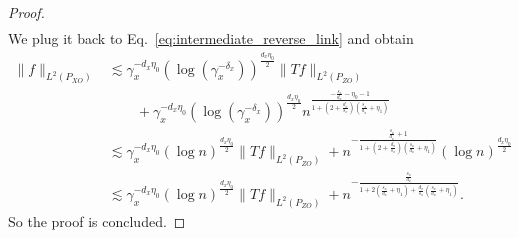 \documentclass[11pt]{article}
\newcommand{\0}{\mathbf{0}}
\begin{document}
\begin{appendix}
\begin{proof}
\begin{align*}
\end{align*}
We plug it back to Eq.~\eqref{eq:intermediate_reverse_link} and obtain
\begin{align*}
    \|f\|_{L^2(P_{XO})} &\lesssim \gamma_x^{-d_x\eta_0} (\log (\gamma_x^{-\delta_x}))^{\frac{d_x\eta_0}{2}} \|Tf\|_{L^2(P_{ZO})} \\
    &\qquad + \gamma_x^{-d_x\eta_0} (\log (\gamma_x^{-\delta_x}))^{\frac{d_x\eta_0}{2}} n^{\frac{-\frac{s_x}{d_x} - \eta_0 - 1}{1+(2+\frac{d_o}{s_o})(\frac{s_x}{d_x}+\eta_1)}} \\
    &\lesssim \gamma_x^{-d_x\eta_0} (\log n)^{\frac{d_x\eta_0}{2}} \|Tf\|_{L^2(P_{ZO})} + n^{-\frac{\frac{s_x}{d_x} + 1}{1+(2 + \frac{d_o}{s_o})(\frac{s_x}{d_x}+\eta_1)}}(\log n)^{\frac{d_x\eta_0}{2}} \\
    &\lesssim \gamma_x^{-d_x\eta_0} (\log n)^{\frac{d_x\eta_0}{2}} \|Tf\|_{L^2(P_{ZO})} + n^{-\frac{\frac{s_x}{d_x} }{1+2(\frac{s_x}{d_x}+\eta_1)+ \frac{d_o}{s_o}(\frac{s_x}{d_x}+\eta_1)}}.
\end{align*}
So the proof is concluded.
\end{proof}



\end{appendix}
\end{document}
